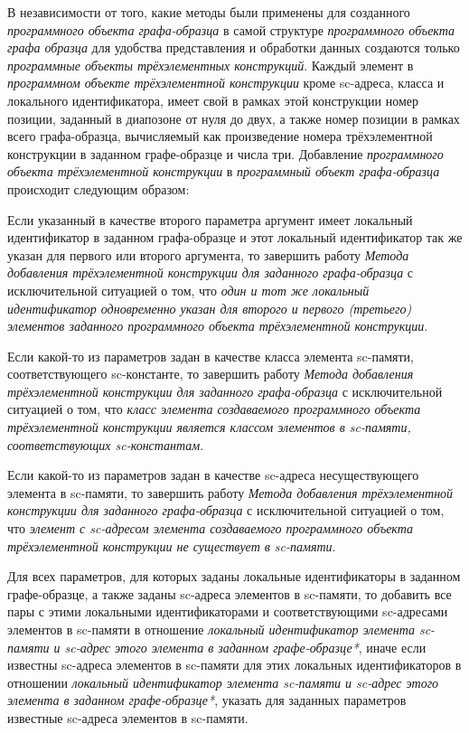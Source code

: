 В независимости от того, какие методы были применены для созданного \textit{программного объекта графа-образца} в самой структуре \textit{программного объекта графа образца}  для удобства представления и обработки данных создаются только \textit{программные объекты трёхэлементных конструкций}. Каждый элемент в \textit{программном объекте трёхэлементной конструкции} кроме sc-адреса, класса и локального идентификатора, имеет свой в рамках этой конструкции номер позиции, заданный в диапозоне от нуля до двух, а также номер позиции в рамках всего графа-образца, вычисляемый как произведение номера трёхэлементной конструкции в заданном графе-образце и числа три. Добавление \textit{программного объекта трёхэлементной конструкции} в \textit{программный объект графа-образца} происходит следующим образом:
\begin{textitemize}
	\item Если указанный в качестве второго параметра аргумент имеет локальный идентификатор в заданном графа-образце и этот локальный идентификатор так же указан для первого или второго аргумента, то завершить работу \textit{Метода добавления трёхэлементной конструкции для заданного графа-образца} с исключительной ситуацией о том, что \textit{один и тот же локальный идентификатор одновременно указан для второго и первого (третьего) элементов заданного программного объекта трёхэлементной конструкции}.
	\item Если какой-то из параметров задан в качестве класса элемента sc-памяти, соответствующего sc-константе, то завершить работу \textit{Метода добавления трёхэлементной конструкции для заданного графа-образца} с исключительной ситуацией о том, что \textit{класс элемента создаваемого программного объекта трёхэлементной конструкции является классом элементов в sc-памяти, соответствующих sc-константам}.
	\item Если какой-то из параметров задан в качестве sc-адреса несуществующего элемента в sc-памяти, то завершить работу \textit{Метода добавления трёхэлементной конструкции для заданного графа-образца} с исключительной ситуацией о том, что \textit{элемент с sc-адресом элемента создаваемого программного объекта трёхэлементной конструкции не существует в sc-памяти}.
	\item Для всех параметров, для которых заданы локальные идентификаторы в заданном графе-образце, а также заданы sc-адреса элементов в sc-памяти, то добавить все пары с этими локальными идентификаторами и соответствующими sc-адресами элементов в sc-памяти в отношение \textit{локальный идентификатор элемента sc-памяти и sc-адрес этого элемента в заданном графе-образце*}, иначе если известны sc-адреса элементов в sc-памяти для этих локальных идентификаторов в отношении \textit{локальный идентификатор элемента sc-памяти и sc-адрес этого элемента в заданном графе-образце*}, указать для заданных параметров известные sc-адреса элементов в sc-памяти.

\end{textitemize}
